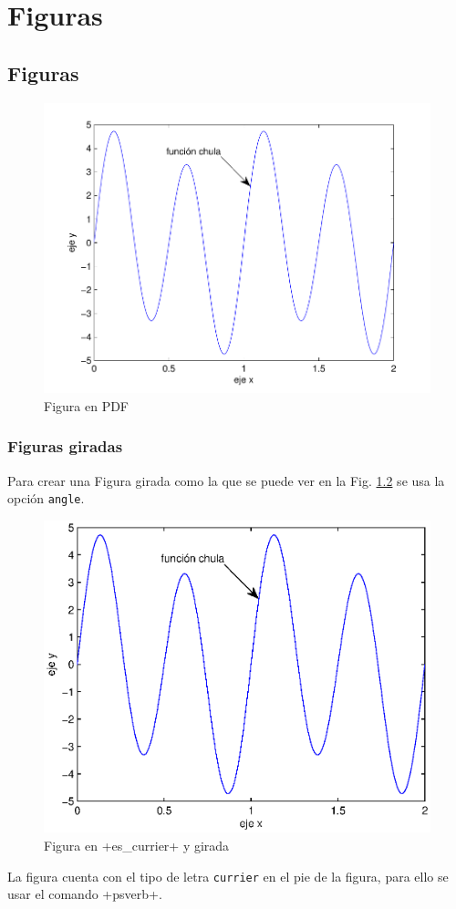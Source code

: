 \chapter{Figuras} \label{anexoB}
\newpage

\section{Figuras}
\blindtext
\begin{figure}[htb]
	\centering
	\includegraphics[width=0.7\linewidth]{anexo_b/figuras_dir/ejemplo-eps-converted-to.pdf}
	\caption{Figura en PDF}
	\label{FiguraB_1}
\end{figure} 

	\subsection{Figuras giradas}
	
	\blindtext	
	\blindtext
	\blindtext
	
	Para crear una Figura girada como la que se puede ver en la Fig. \ref{FiguraB_2} se usa la opción \verb|angle|.
	
	\begin{figure}[htb]
		\centering
		\includegraphics[width=0.7\linewidth,angle=90]{anexo_b/figuras_dir/ejemplo.eps}
		\caption{Figura en {\psverb+es\_currier+} y girada}
		\label{FiguraB_2}
	\end{figure} 

	La figura cuenta con el tipo de letra \verb|currier| en el pie de la figura, para ello se usar el comando {\psverb+psverb+}.
